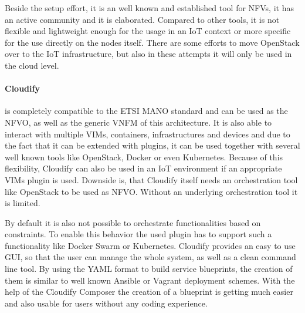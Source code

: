 Beside the setup effort, it is an well known and established tool for \acp{NFV}, it has an active community and it is elaborated.
Compared to other tools, it is not flexible and lightweight enough for the usage in an \ac{IoT} context or more specific for the use directly on the nodes itself.
There are some efforts to move OpenStack over to the \ac{IoT} infrastructure\autocite{OpenStack:IoT}\autocite{OpenStack:Kubernetes:IoT}, but also in these attempts it will only be used in the cloud level.

\paragraph{Cloudify} is completely compatible to the \ac{ETSI} \ac{MANO} standard and can be used as the \ac{NFVO}, as well as the generic \ac{VNFM} of this architecture.\autocite[cf.]{Cloudify:MANO}
It is also able to interact with multiple \acp{VIM}, containers, infrastructures and devices and due to the fact that it can be extended with plugins, it can be used together with several well known tools like OpenStack, Docker or even Kubernetes.\autocite[cf.]{Cloudify:MANO}
Because of this flexibility, Cloudify can also be used in an \ac{IoT} environment if an appropriate \acp{VIM} plugin is used.
Downside is, that Cloudify itself needs an orchestration tool like OpenStack to be used as \ac{NFVO}.
Without an underlying orchestration tool it is limited.

By default it is also not possible to orchestrate functionalities based on constraints.
To enable this behavior the used plugin has to support such a functionality like Docker Swarm or Kubernetes.
Cloudify provides an easy to use \ac{GUI}, so that the user can manage the whole system, as well as a clean command line tool.
By using the \ac{YAML} format to build service blueprints, the creation of them is similar to well known Ansible or Vagrant deployment schemes.
With the help of the Cloudify Composer the creation of a blueprint is getting much easier and also usable for users without any coding experience.

